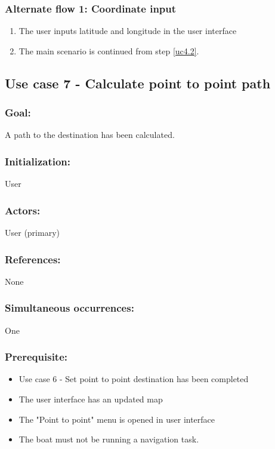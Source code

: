 \subsubsection*{Alternate flow 1: Coordinate input}
	\begin{enumerate}
		\item The user inputs latitude and longitude in the user interface
		\item The main scenario is continued from step \ref{uc4.2}.
	\end{enumerate}


\subsection{Use case 7 - Calculate point to point path}
\subsubsection*{Goal:}
A path to the destination has been calculated.

\subsubsection*{Initialization:}
User

\subsubsection*{Actors:}
User (primary)

\subsubsection*{References:}
None

\subsubsection*{Simultaneous occurrences:}
One 

\subsubsection*{Prerequisite:}
\begin{itemize}
	\item Use case 6 - Set point to point destination has been completed
	\item The user interface has an updated map
	\item The "Point to point" menu is opened in user interface
	\item The boat must not be running a navigation task.
\end{itemize}

